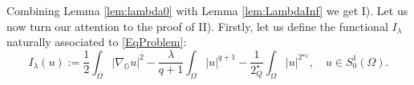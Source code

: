 \documentclass[11pt]{amsart}
\numberwithin{equation}{section} %
\theoremstyle{definition}
\def\G{\mathbb{G}}
\newcommand{\m}{\mbox}
\begin{document}
%	

Combining Lemma \ref{lem:lambda0} with Lemma \ref{lem:LambdaInf} we get I). Let us now turn our attention to the proof of II). Firstly, let us define the functional $I_{\lambda}$ naturally associated to \eqref{EqProblem}:
\begin{equation}\label{eq:Def_Ilambda}
	I_{\lambda}(u) := \dfrac{1}{2}\int_{\Omega}|\nabla_{\G}u|^2 - \dfrac{\lambda}{q+1}\int_{\Omega}|u|^{q+1} - \dfrac{1}{2^{\star}_{Q}}\int_{\Omega}|u|^{2^{\star_{Q}}}, \quad u\in S^{1}_{0}(\Omega).
\end{equation}
\end{document}
